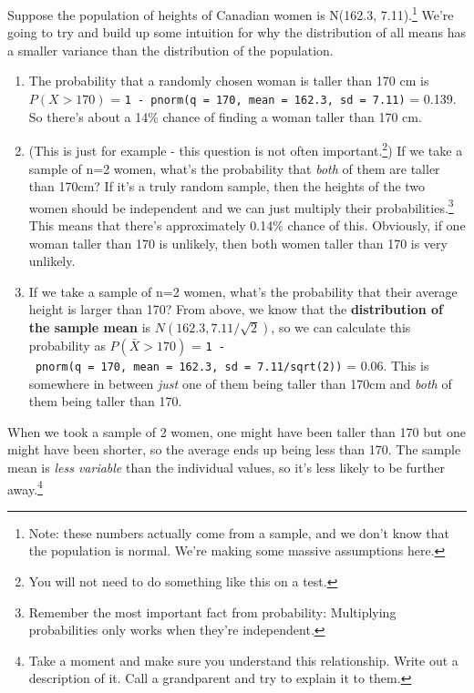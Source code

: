 \documentclass[
  letterpaper,
  DIV=11,
  numbers=noendperiod]{scrreprt}
\providecommand{\tightlist}{%
  \setlength{\itemsep}{0pt}\setlength{\parskip}{0pt}}\usepackage{longtable,booktabs,array}
\begin{document}
Suppose the population of heights of Canadian women is N(162.3,
7.11).\footnote{Note: these numbers actually come from a sample, and we
  don't know that the population is normal. We're making some massive
  assumptions here.} We're going to try and build up some intuition for
why the distribution of all means has a smaller variance than the
distribution of the population.

\begin{enumerate}
\def\labelenumi{\arabic{enumi}.}
\tightlist
\item
  The probability that a randomly chosen woman is taller than 170 cm is
  \(P(X > 170)\) =
  \texttt{1\ -\ pnorm(q\ =\ 170,\ mean\ =\ 162.3,\ sd\ =\ 7.11)} =
  0.139. So there's about a 14\% chance of finding a woman taller than
  170 cm.
\item
  (This is just for example - this question is not often
  important.\footnote{You will not need to do something like this on a
    test.}) If we take a sample of n=2 women, what's the probability
  that \emph{both} of them are taller than 170cm? If it's a truly random
  sample, then the heights of the two women should be independent and we
  can just multiply their probabilities.\footnote{Remember the most
    important fact from probability: Multiplying probabilities only
    works when they're independent.} This means that there's
  approximately 0.14\% chance of this. Obviously, if one woman taller
  than 170 is unlikely, then both women taller than 170 is very
  unlikely.
\item
  If we take a sample of n=2 women, what's the probability that their
  average height is larger than 170? From above, we know that the
  \textbf{distribution of the sample mean} is
  \(N(162.3, 7.11/\sqrt{2})\), so we can calculate this probability as
  \(P(\bar X > 170)\) =
  \texttt{1\ -\ pnorm(q\ =\ 170,\ mean\ =\ 162.3,\ sd\ =\ 7.11/sqrt(2))}
  = 0.06. This is somewhere in between \emph{just} one of them being
  taller than 170cm and \emph{both} of them being taller than 170.
\end{enumerate}

When we took a sample of 2 women, one might have been taller than 170
but one might have been shorter, so the average ends up being less than
170. The sample mean is \emph{less variable} than the individual values,
so it's less likely to be further away.\footnote{Take a moment and make
  sure you understand this relationship. Write out a description of it.
  Call a grandparent and try to explain it to them.}
\end{document}
